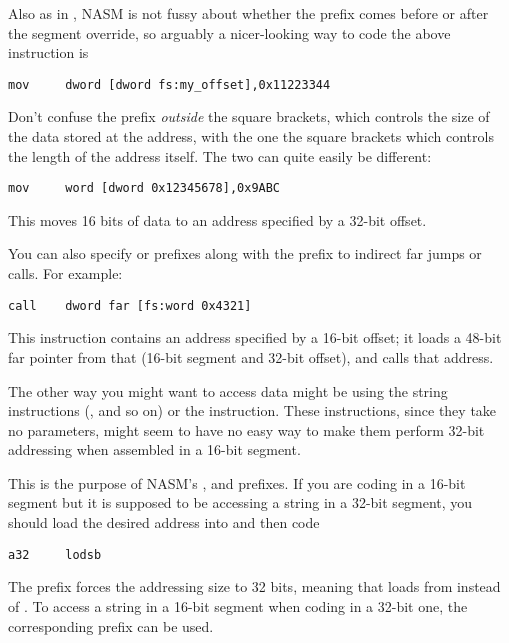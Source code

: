 Also as in , NASM is not fussy about whether the
 prefix comes before or after the segment override, so
arguably a nicer-looking way to code the above instruction is

\begin{lstlisting}
mov     dword [dword fs:my_offset],0x11223344
\end{lstlisting}

Don't confuse the  prefix \emph{outside} the square brackets,
which controls the size of the data stored at the address, with the
one  the square brackets which controls the length of the
address itself. The two can quite easily be different:

\begin{lstlisting}
mov     word [dword 0x12345678],0x9ABC
\end{lstlisting}

This moves 16 bits of data to an address specified by a 32-bit
offset.

You can also specify  or  prefixes along with the
 prefix to indirect far jumps or calls. For example:

\begin{lstlisting}
call    dword far [fs:word 0x4321]
\end{lstlisting}

This instruction contains an address specified by a 16-bit offset;
it loads a 48-bit far pointer from that (16-bit segment and 32-bit
offset), and calls that address.


The other way you might want to access data might be using the
string instructions (,  and so on) or the
 instruction. These instructions, since they take no
parameters, might seem to have no easy way to make them perform
32-bit addressing when assembled in a 16-bit segment.

This is the purpose of NASM's ,  and
 prefixes. If you are coding  in a 16-bit
segment but it is supposed to be accessing a string in a 32-bit segment,
you should load the desired address into  and then code

\begin{lstlisting}
a32     lodsb
\end{lstlisting}

The prefix forces the addressing size to 32 bits, meaning that
 loads from \code{[DS:ESI]} instead of \code{[DS:SI]}.
To access a string in a 16-bit segment when coding in a 32-bit one,
the corresponding  prefix can be used.

